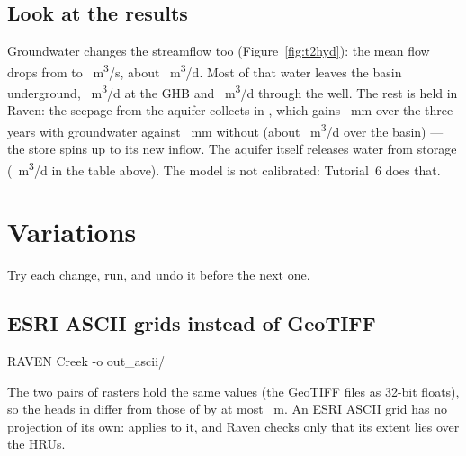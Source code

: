 \subsection{Look at the results}
Groundwater changes the streamflow too (Figure~\ref{fig:t2hyd}): the mean flow drops from  to
~m\textsuperscript{3}/s, about ~m\textsuperscript{3}/d. Most of that water leaves the basin
underground, ~m\textsuperscript{3}/d at the GHB and ~m\textsuperscript{3}/d through the well. The rest
is held in Raven: the seepage from the aquifer collects in , which gains ~mm over the three
years with groundwater against ~mm without (about ~m\textsuperscript{3}/d over the basin) ---
the store spins up to its new inflow. The aquifer itself releases water from storage (~m\textsuperscript{3}/d in
the table above). The model is not calibrated: Tutorial~6 does that.

\section{Variations}
Try each change, run, and undo it before the next one.

\subsection{ESRI ASCII grids instead of GeoTIFF}
\begin{shell}
$ $RAVEN Creek -o out_ascii/
\end{shell}
The two pairs of rasters hold the same values (the GeoTIFF files as 32-bit floats), so the heads in
 differ from those of  by at most ~m. An ESRI ASCII grid has no
projection of its own:  applies to it, and Raven checks only that its extent lies over the HRUs.

